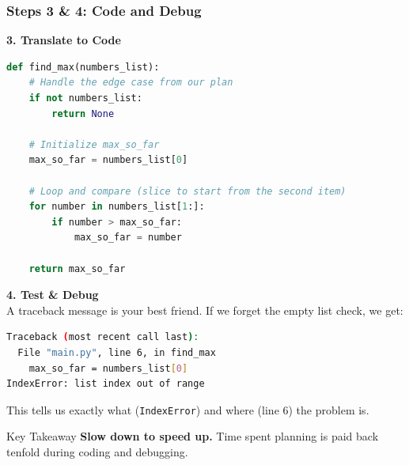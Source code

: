 \documentclass{beamer}
\begin{document}
\begin{frame}[fragile]
    \frametitle{Steps 3 \& 4: Code and Debug}
    \textbf{3. Translate to Code}
    \begin{lstlisting}[language=Python]
def find_max(numbers_list):
    # Handle the edge case from our plan
    if not numbers_list:
        return None

    # Initialize max_so_far
    max_so_far = numbers_list[0]

    # Loop and compare (slice to start from the second item)
    for number in numbers_list[1:]:
        if number > max_so_far:
            max_so_far = number

    return max_so_far
    \end{lstlisting}

    \textbf{4. Test \& Debug} \\
    A traceback message is your best friend. If we forget the empty list check, we get:
    \begin{lstlisting}[language=bash, basicstyle=\ttfamily\tiny]
Traceback (most recent call last):
  File "main.py", line 6, in find_max
    max_so_far = numbers_list[0]
IndexError: list index out of range
    \end{lstlisting}
    This tells us exactly what (\texttt{IndexError}) and where (line 6) the problem is.

    \begin{alertblock}{Key Takeaway}
        \textbf{Slow down to speed up.} Time spent planning is paid back tenfold during coding and debugging.
    \end{alertblock}
\end{frame}
\end{document}

